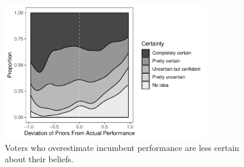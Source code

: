 \documentclass[11pt]{article}
\begin{document}
\begin{table}

\label{TableAmbiguity}
\end{table}

\begin{figure}
\begin{center}
\includegraphics[width=0.8\textwidth]{./Figures/BF_FigBiasCertainty.pdf}
\end{center}
\caption{Voters who overestimate incumbent performance are less certain about their beliefs. } 
\label{FigBiasCertainty}
\end{figure}

\label{sec:References}


\end{document}

